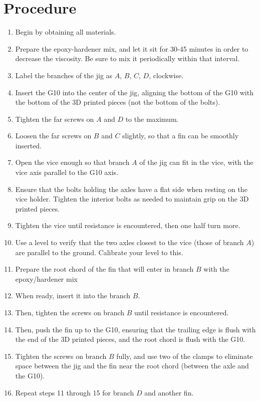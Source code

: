 \documentclass{amsdtx}
\begin{document}
\section{Procedure}
\begin{enumerate}
	\item Begin by obtaining all materials.
	\item Prepare the epoxy-hardener mix, and let it sit for 30-45 minutes in order to decrease the viscosity. Be sure to mix it periodically within that interval.
	\item Label the branches of the jig as $A$, $B$, $C$, $D$, clockwise.
	\item Insert the G10 into the center of the jig, aligning the bottom of the G10 with the bottom of the 3D printed pieces (not the bottom of the bolts).
	\item Tighten the far screws on $A$ and $D$ to the maximum.
	\item Loosen the far screws on $B$ and $C$ slightly, so that a fin can be smoothly inserted. 
	\item Open the vice enough so that branch $A$ of the jig can fit in the vice, with the vice axis parallel to the G10 axis.
	\item Ensure that the bolts holding the axles have a flat side when resting on the vice holder. Tighten the interior bolts as needed to maintain grip on the 3D printed pieces.
	\item Tighten the vice until resistance is encountered, then one half turn more.
	\item Use a level to verify that the two axles closest to the vice (those of branch $A$) are parallel to the ground. Calibrate your level to this.
	\item Prepare the root chord of the fin that will enter in branch $B$ with the epoxy/hardener mix
	\item When ready, insert it into the branch $B$. 
	\item Then, tighten the screws on branch $B$ until resistance is encountered.
	\item Then, push the fin up to the G10, ensuring that the trailing edge is flush with the end of the 3D printed pieces, and the root chord is flush with the G10.
	\item Tighten the screws on branch $B$ fully, and use two of the clamps to eliminate space between the jig and the fin near the root chord (between the axle and the G10).
	\item Repeat steps 11 through 15 for branch $D$ and another fin.

\end{enumerate}
\end{document}
